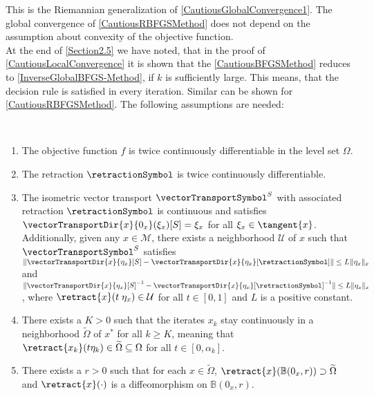 This is the Riemannian generalization of \cref{CautiousGlobalConvergence1}. The global convergence of \cref{CautiousRBFGSMethod} does not depend on the assumption about convexity of the objective function. \\
At the end of \cref{Section2.5} we have noted, that in the proof of \cref{CautiousLocalConvergence} it is shown that the \cref{CautiousBFGSMethod} reduces to \cref{InverseGlobalBFGS-Method}, if $k$ is sufficiently large. This means, that the decision rule is satisfied in every iteration. Similar can be shown for \cref{CautiousRBFGSMethod}. The following assumptions are needed:

\begin{assumption}\label{AssumptionLocalConvergenceCautiousRBFGS} \ \\[-1.5\baselineskip]
    \begin{enumerate}
        \item The objective function $f$ is twice continuously differentiable in the level set $\Omega$.
        \item The retraction $\retractionSymbol$ is twice continuously differentiable.
        \item The isometric vector transport $\vectorTransportSymbol^S$ with associated retraction $\retractionSymbol$ is continuous and satisfies $\vectorTransportDir{x}{0_x}(\xi_x)[S] = \xi_x$ for all $\xi_x \in \tangent{x}$. Additionally, given any $x \in \mathcal{M}$, there exists a neighborhood $\mathcal{U}$ of $x$ such that $\vectorTransportSymbol^S$ satisfies $\lVert \vectorTransportDir{x}{\eta_x}[S] - \vectorTransportDir{x}{\eta_x}[\retractionSymbol] \rVert \leq L \lVert \eta_x \rVert_x$ and $\lVert {\vectorTransportDir{x}{\eta_x}[S]}^{-1} - {\vectorTransportDir{x}{\eta_x}[\retractionSymbol]}^{-1} \rVert \leq L \lVert \eta_x \rVert_x$, where $\retract{x}(t \; \eta_x) \in \mathcal{U}$ for all $t \in [0,1]$ and $L$ is a positive constant. \label{AssumptionLocalConvergenceCautiousRBFGS1}
        \item There exists a $K > 0$ such that the iterates $x_k$ stay continuously in a neighborhood $\widetilde{\Omega}$ of $x^*$ for all $k \geq K$, meaning that $\retract{x_k}(t \eta_k) \in \widetilde{\Omega} \subseteq \Omega$ for all $t \in [0, \alpha_k]$. \label{AssumptionLocalConvergenceCautiousRBFGS2}
        \item There exists a $r > 0$ such that for each $x \in \widetilde{\Omega}$, $\retract{x}(\mathbb{B}(0_x, r)) \supset \widetilde{\Omega}$ and $\retract{x}(\cdot)$ is a diffeomorphism on $\mathbb{B}(0_x, r)$. \label{AssumptionLocalConvergenceCautiousRBFGS3}
    \end{enumerate}  
\end{assumption}

